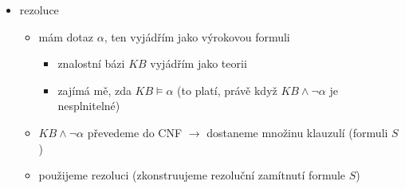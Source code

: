 \begin{itemize}
\begin{itemize}
\begin{itemize}
\begin{itemize}
\item každá proměnná má počítadlo proměnných, které na ni ukazují
\item postupně beru pravdivé proměnné, snižuju počítadla u proměnných, na které ukazují
\item jakmile u proměnné klesne počítadlo na nulu, zařadím mezi pravdivé proměnné
\end{itemize}
\end{itemize}
\item backward chaining \dots{} goal-driven reasoning
\begin{itemize}
\item něco mě zajímá - pokouším se to odvodit
\begin{itemize}
\item najdu klauzule, kde je nějaký literál z $\alpha$ na pravé straně implikace
\item tak dostanu další literály, které musím dokázat
\item postupuju tak dlouho, dokud se nedostanu k faktům (literálům, o nichž vím, že platí)
\end{itemize}
\item tohle se používá v Prologu
\item opět vlastně používám rezoluční pravidlo
\begin{itemize}
\item to, co chci zjistit, rezolvuju s libovolnou klauzulí
\end{itemize}
\end{itemize}
\item forward chaining prochází spoustu klauzulí, které nás nezajímají - backward chaining může mít výrazně menší složitost
\end{itemize}
\item rezoluce
\begin{itemize}
\item mám dotaz $\alpha$, ten vyjádřím jako výrokovou formuli
\begin{itemize}
\item znalostní bázi $KB$ vyjádřím jako teorii
\item zajímá mě, zda $KB\models\alpha$ (to platí, právě když $KB\land\neg\alpha$ je nesplnitelné)
\end{itemize}
\item $KB\land\neg\alpha$ převedeme do CNF $\to$ dostaneme množinu klauzulí (formuli $S$)
\item použijeme rezoluci (zkonstruujeme rezoluční zamítnutí formule $S$)

\end{itemize}
\end{itemize}
